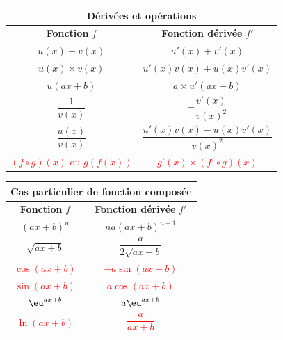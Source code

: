 \documentclass[main.tex]{subfiles}
\begin{document}
\begin{center}
\hfill 
\renewcommand{\arraystretch}{2.0}
\begin{tabular}{|c|c|}\hline 
	\multicolumn{2}{|c|}{\textbf{Dérivées et opérations} }\\
	\hline 
	\textbf{Fonction} $f$ & \textbf{Fonction dérivée} $f'$\\
	\hline
	$u(x) + v(x)$ & $u'(x) + v'(x)$\\
	\hline
	$u(x) \times v(x)$ & $u'(x)v(x) + u(x)v'(x)$\\
	\hline
	$u(ax+b)$ & $a\times u'(ax+b)$ \\
	\hline
	$\dfrac{1}{v(x)}$ & $-\dfrac{v'(x)}{v(x)^2}$\\
	\hline
	$\dfrac{u(x)}{v(x)}$ & $\dfrac{u'(x)v(x) - u(x)v'(x)}{v(x)^2}$\\
	\hline
	\textcolor{red}{$(f\circ g)(x)$ ou $g(f(x))$} & \textcolor{red}{$g'(x) \times (f' \circ g)(x)$}\\
	\hline
\end{tabular}  
\hfill 
\renewcommand{\arraystretch}{2.0}
\begin{tabular}{|c|c|}\hline
	\multicolumn{2}{|c|}{\textbf{Cas particulier de fonction composée} }\\
	\hline 
	\textbf{Fonction} $f$ & \textbf{Fonction dérivée} $f'$\\
	\hline
	$(ax+b)^n$ & $na(ax+b)^{n-1}$ \\
	\hline
	$\sqrt{ax+b}$ & $\dfrac{a}{2\sqrt{ax+b}}$ \\
	\hline
	\textcolor{red}{$\cos(ax+b)$} & \textcolor{red}{$-a\sin (ax+b)$} \\
	\hline
	\textcolor{red}{$\sin(ax+b)$} & \textcolor{red}{$a\cos (ax+b)$} \\
	\hline
	\textcolor{red}{$\eu^{ax+b}$} & \textcolor{red}{$a\eu^{ax+b}$} \\
	\hline
	\textcolor{red}{$\ln(ax+b)$} & \textcolor{red}{$\dfrac{a}{ax+b}$} \\
	\hline
\end{tabular}  
\hfill \null
\end{center}
 
 
 
 
%	 
\end{document}
